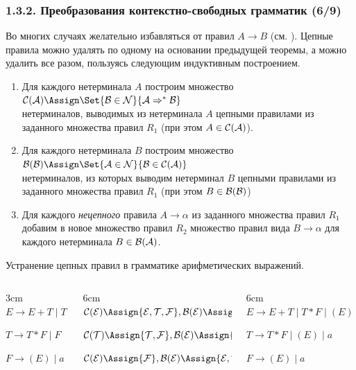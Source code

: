 \begin{frame}
\frametitle{1.3.2. Преобразования контекстно-свободных грамматик (6/9)}


Во многих случаях желательно избавляться от 
 правил $A\to B$ 
(см. ).
Цепные правила можно удалять по одному на основании предыдущей теоремы,
а можно удалить все разом, 
пользуясь следующим индуктивным построением.

\begin{enumerate}
\item Для каждого нетерминала $A$ построим
множество 
$\cal{C}(A)\Assign\Set{B\in N}{A\Rightarrow^* B}$\\
нетерминалов, выводимых из нетерминала $A$ 
цепными правилами из заданного множества правил $R_1$ (при этом $A\in \cal{C}(A)$).
\item Для каждого нетерминала $B$ построим
множество $\cal{B}(B)\Assign\Set{A\in N}{B\in \cal{C}(A)}$\\
нетерминалов, из которых выводим нетерминал $B$ 
цепными правилами из заданного множества правил $R_1$ (при этом $B\in \cal{B}(B)$) 
\item Для каждого {\em нецепного}
правила $A\to\alpha$ из заданного множества правил $R_1$ 
добавим в новое множество правил $R_2$
множество правил вида $B\to \alpha$ для каждого нетерминала 
$B\in\cal{B}(A)$.
\end{enumerate}

\begin{example}
Устранение цепных 
правил в грамматике арифметических выражений. 
\begin{columns}
\begin{column}{3cm}
$E\to E+T\mid T$

$T\to T*F\mid F$

$F\to (E)\mid a$
\end{column}
\begin{column}{6cm}
$\cal{C}(E)\Assign \{E, T, F\},\cal{B}(E)\Assign \{E\}$

$\cal{C}(T)\Assign \{T, F\},\cal{B}(E)\Assign \{E, T\}$

$\cal{C}(E)\Assign \{F\},\cal{B}(E)\Assign \{E, T, F\}$

\end{column}
\begin{column}{6cm}
$E\to E+T\mid T*F \mid (E) \mid a $

$T\to T*F\mid (E) \mid a $

$F\to (E)\mid a$
\end{column}
\end{columns}
\end{example}
\end{frame}


